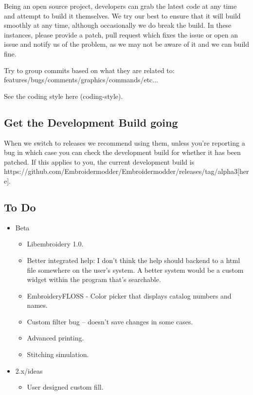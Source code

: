 \documentclass[11pt]{report}
\begin{document}
Being an open source project, developers can grab the latest code at any time
and attempt to build it themselves. We try our best to ensure that it will build smoothly
at any time, although occasionally we do break the build. In these instances,
please provide a patch, pull request which fixes the issue or open an issue and
notify us of the problem, as we may not be aware of it and we can build fine.

Try to group commits based on what they are related to: features/bugs/comments/graphics/commands/etc...

See the coding style  here (coding-style).

\subsection{Get the Development Build going}

When we switch to releases we recommend using them, unless you're reporting a bug in which case you can check the development build for whether it has been patched. If this applies to you, the current development build is https://github.com/Embroidermodder/Embroidermodder/releases/tag/alpha3[here].

\subsection{To Do}

\begin{itemize}
\item Beta
\begin{itemize}
\item Libembroidery 1.0.
\item Better integrated help: I don't think the help should backend to a html file somewhere on the user's system. A better system would be a custom widget within the program that's searchable.
\item EmbroideryFLOSS - Color picker that displays catalog numbers and names.
\item Custom filter bug -- doesn't save changes in some cases.
\item Advanced printing.
\item Stitching simulation.
\end{itemize}
\item 2.x/ideas
\begin{itemize}
\item User designed custom fill.
\end{itemize}
\end{itemize}
\end{document}
